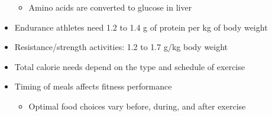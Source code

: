 \documentclass[12pt]{article}
\begin{document}
\begin{itemize}
                    \begin{itemize}
                        \item Amino acids are converted to glucose in liver
                    \end{itemize}
                \item Endurance athletes need 1.2 to 1.4 g of protein per kg of body weight
                \item Resistance/strength activities: 1.2 to 1.7 g/kg body weight
                \item Total calorie needs depend on the type and schedule of exercise
                \item Timing of meals affects fitness performance
                    \begin{itemize}
                        \item Optimal food choices vary before, during, and after exercise
                    \end{itemize}
            \end{itemize}
\end{document}
